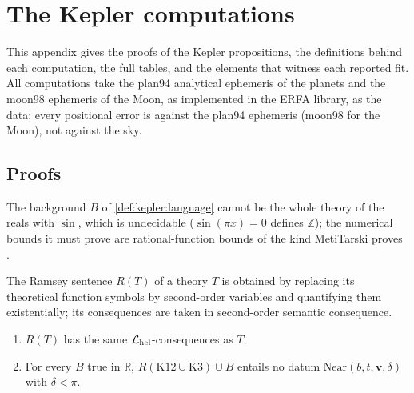 \section{The Kepler computations}\label{app:kepler}

This appendix gives the proofs of the Kepler propositions, the definitions behind each computation, the full tables, and the elements that witness each reported fit. All computations take the plan94 analytical ephemeris of the planets and the moon98 ephemeris of the Moon, as implemented in the ERFA library, as the data; every positional error is against the plan94 ephemeris (moon98 for the Moon), not against the sky.

\subsection{Proofs}\label{sec:kepler:proofs}

The background $B$ of \cref{def:kepler:language} cannot be the whole theory of the reals with $\sin$, which is undecidable ($\sin(\pi x)=0$ defines $\mathbb Z$); the numerical bounds it must prove are rational-function bounds of the kind MetiTarski proves \citep{akbarpour2010metitarski}.

The Ramsey sentence $R(T)$ of a theory $T$ is obtained by replacing its theoretical function symbols by second-order variables and quantifying them existentially; its consequences are taken in second-order semantic consequence.

\begin{proposition}\label{prop:kepler:ramsey}
\leavevmode
\begin{enumerate}[label=(\alph*),leftmargin=*,itemsep=0pt]
\item $R(T)$ has the same $\mathcal L_{\rm hel}$-consequences as $T$.
\item For every $B$ true in $\mathbb R$, $R(\mathrm{K12}\cup\mathrm{K3})\cup B$ entails no datum $\mathrm{Near}(b,t,\mathbf v,\delta)$ with $\delta<\pi$.
\end{enumerate}
\end{proposition}

